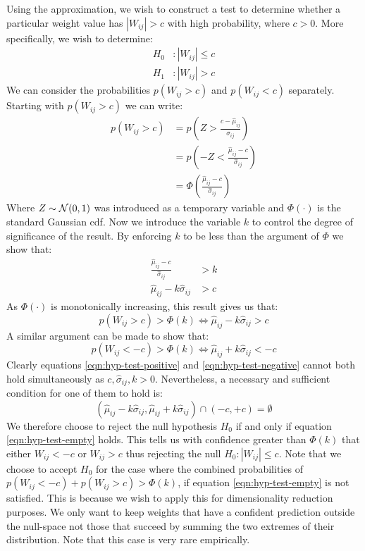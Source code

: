 Using the approximation, we wish to construct a test to determine whether a particular weight value has $|W_{ij}| > c$ with high probability, where $c>0$. More specifically, we wish to determine:
%
\begin{equation}
	\begin{aligned}
		H_0&: |W_{ij}| \leq c \\
		H_1&: |W_{ij}| > c
	\end{aligned}
\end{equation}
%
We can consider the probabilities $p(W_{ij} > c)$ and $p(W_{ij} < c)$ separately. Starting with $p(W_{ij} > c)$ we can write:
%
\begin{align*}
	p(W_{ij} > c) &= p\left(Z > \frac{c - \hat{\mu}_{ij}}{\hat{\sigma}_{ij}}\right) \\
	&= p\left(-Z < \frac{\hat{\mu}_{ij} - c}{\hat{\sigma}_{ij}}\right)\\
	&= \Phi\left(\frac{\hat{\mu}_{ij} - c}{\hat{\sigma}_{ij}}\right)
\end{align*}
%
Where $Z \sim \mathcal{N}(0,1)$ was introduced as a temporary variable and $\Phi(\cdot)$ is the standard Gaussian cdf. Now we introduce the variable $k$ to control the degree of significance of the result. By enforcing $k$ to be less than the argument of $\Phi$ we show that: 
%
\begin{align*}
	\frac{\hat{\mu}_{ij} - c}{\hat{\sigma}_{ij}} &> k \\
	\hat{\mu}_{ij} - k \hat{\sigma}_{ij} &> c
\end{align*}
%
As $\Phi(\cdot)$ is monotonically increasing, this result gives us that:
%
\begin{equation}
	p(W_{ij} > c) > \Phi(k) \iff \hat{\mu}_{ij} - k \hat{\sigma}_{ij} > c
	\label{eqn:hyp-test-positive}
\end{equation}
%
A similar argument can be made to show that:
%
\begin{equation}
	p(W_{ij} < -c) > \Phi(k) \iff \hat{\mu}_{ij} + k \hat{\sigma}_{ij} < -c
	\label{eqn:hyp-test-negative}
\end{equation}
%
Clearly equations \ref{eqn:hyp-test-positive} and \ref{eqn:hyp-test-negative} cannot both hold simultaneously as $c, \hat{\sigma}_{ij}, k>0$. Nevertheless, a necessary and sufficient condition for one of them to hold is:
%
\begin{equation}
	(\hat{\mu}_{ij} - k \hat{\sigma}_{ij}, \hat{\mu}_{ij} + k \hat{\sigma}_{ij}) \cap (-c, +c) = \emptyset
	\label{eqn:hyp-test-empty}
\end{equation}
%
We therefore choose to reject the null hypothesis $H_0$ if and only if equation \ref{eqn:hyp-test-empty} holds. This tells us with confidence greater than $\Phi(k)$ that either $W_{ij} < -c$ or $W_{ij} > c$ thus rejecting the null $H_0: |W_{ij}| \leq c$. Note that we choose to accept $H_0$ for the case where the combined probabilities of $p(W_{ij} < -c) + p(W_{ij} > c) > \Phi(k)$, if equation \ref{eqn:hyp-test-empty} is not satisfied. This is because we wish to apply this for dimensionality reduction purposes. We only want to keep weights that have a confident prediction outside the null-space not those that succeed by summing the two extremes of their distribution. Note that this case is very rare empirically.